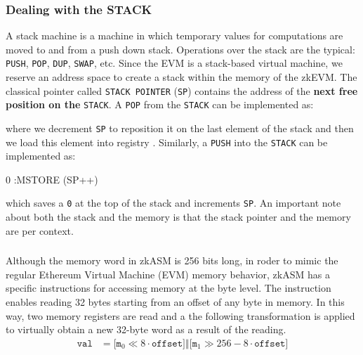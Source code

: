 \subsubsection{Dealing with the STACK}

A stack machine is a machine in which temporary values for computations are moved to and from a push down stack. Operations over the stack are the typical: \texttt{PUSH}, \texttt{POP}, \texttt{DUP}, \texttt{SWAP}, etc. Since the EVM is a stack-based virtual machine, we reserve an address space to create a stack within the memory of the zkEVM. The classical pointer called \texttt{STACK POINTER} (\texttt{SP}) contains the address of the \textbf{next free position on the} \texttt{STACK}. A \texttt{POP} from the \texttt{STACK} can be implemented as:


where we decrement \texttt{SP} to reposition it on the last element of the stack and
then we load this element into registry \A. Similarly, a \texttt{PUSH} into the \texttt{STACK} can be implemented as:

\begin{zkasm}
0		:MSTORE (SP++)
\end{zkasm}

which saves a \texttt{0} at the top of the stack and increments \texttt{SP}. An important note about both the stack and the memory is that the stack pointer and the memory are per context.




\subsubsection{\MEMALIGNRD}

Although the memory word in zkASM is 256 bits long, in roder to mimic the regular Ethereum Virtual Machine (EVM) memory behavior, zkASM has a specific instructions for accessing memory at the byte level. The instruction \MEMALIGNRD enables reading 32 bytes starting from an offset of any byte in memory. In this way, two memory registers are read and a the following transformation is applied to virtually obtain a new 32-byte word as a result of the reading.
\begin{align*}
    \texttt{val} &= \Bigr[ \texttt{m}_0 \ll 8 \cdot \texttt{offset} \Bigr] \mathbin\Vert \Bigr[ \texttt{m}_1 \gg 256- 8 \cdot \texttt{offset} \Bigr] 
\end{align*}

